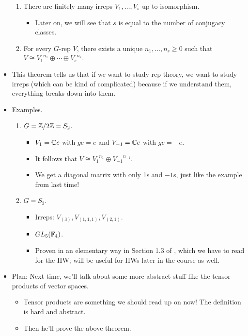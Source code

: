 \documentclass[../notes.tex]{subfiles}
\begin{document}
\begin{itemize}
\begin{enumerate}
        \item There are finitely many irreps $V_1,\dots,V_s$ up to isomorphism.
        \begin{itemize}
            \item Later on, we will see that $s$ is equal to the number of conjugacy classes.
        \end{itemize}
        \item For every $G$-rep $V$, there exists a unique $n_1,\dots,n_s\geq 0$ such that $V\cong{V_1}^{n_1}\oplus\cdots\oplus{V_s}^{n_s}$.
    \end{enumerate}
    \item This theorem tells us that if we want to study rep theory, we want to study irreps (which can be kind of complicated) because if we understand them, everything breaks down into them.
    \item Examples.
    \begin{enumerate}
        \item $G=\mathbb{Z}/2\mathbb{Z}=S_2$.
        \begin{itemize}
            \item $V_1=\mathbb{C} e$ with $ge=e$ and $V_{-1}=\mathbb{C} e$ with $ge=-e$.
            \item It follows that $V\cong{V_1}^{n_1}\oplus{V_{-1}}^{n_{-1}}$.
            \item We get a diagonal matrix with only 1s and $-1$s, just like the example from last time!
        \end{itemize}
        \item $G=S_3$.
        \begin{itemize}
            \item Irreps: $V_{(3)},V_{(1,1,1)},V_{(2,1)}$.
            \item $GL_5(\mathbb{F}_4)$.
            \item Proven in an elementary way in Section 1.3 of \textcite{bib:FultonHarris}, which we have to read for the HW; will be useful for HWs later in the course as well.
        \end{itemize}
    \end{enumerate}
    \item Plan: Next time, we'll talk about some more abstract stuff like the tensor products of vector spaces.
    \begin{itemize}
        \item Tensor products are something we should read up on now! The definition is hard and abstract.
        \item Then he'll prove the above theorem.
    \end{itemize}
\end{itemize}
\end{document}
